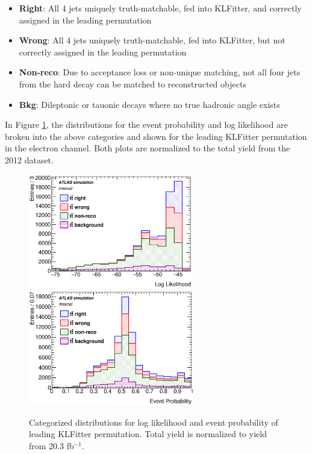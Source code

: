 \begin{itemize}
\item \textbf{Right}: All 4 jets uniquely truth-matchable, fed into KLFitter, and correctly assigned in the leading permutation
\item \textbf{Wrong}: All 4 jets uniquely truth-matchable, fed into KLFitter, but not correctly assigned in the leading permutation
\item \textbf{Non-reco}: Due to acceptance loss or non-unique matching, not all four jets from the hard \ttbar decay can  be matched to reconstructed objects
\item \textbf{Bkg}: Dileptonic or tauonic \ttbar decays where no true hadronic angle exists
\end{itemize}

In Figure \ref{fig:hadronicOpt_stack}, the \ttbar distributions for the event probability and log likelihood are broken into the above categories and shown for the leading KLFitter permutation in the electron channel. Both plots are normalized to the total \ttbar yield from the 2012 dataset.

\begin{figure}[htbp]
\begin{center}
		\includegraphics[height=50mm]{chapters/whel/figures/lh_stack}
		\includegraphics[height=50mm]{chapters/whel/figures/evProb_stack}
		\caption{Categorized \ttbar distributions for log likelihood and event probability of leading KLFitter permutation. Total yield is normalized to \ttbar yield from 20.3 fb$^{-1}$.}
	\label{fig:hadronicOpt_stack}
\end{center}	
\end{figure}

